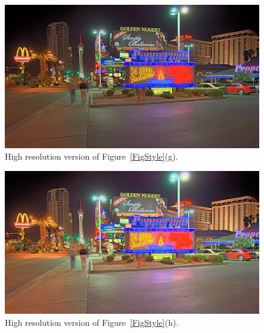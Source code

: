 \begin{figure}
\begin{center}
\includegraphics[width=\textwidth]{figures/chapter5/style_based/Peppermill_hdrcandy_w0_1_small.jpg}
\caption{High resolution version of Figure~\ref{FigStyle}(g).}
\end{center}
\end{figure}

\begin{figure}
\begin{center}
\includegraphics[width=\textwidth]{figures/chapter5/style_based/Peppermill_hdrcandy_w0_w1_w2_small.jpg}
\caption{High resolution version of Figure~\ref{FigStyle}(h).}
\end{center}
\end{figure}